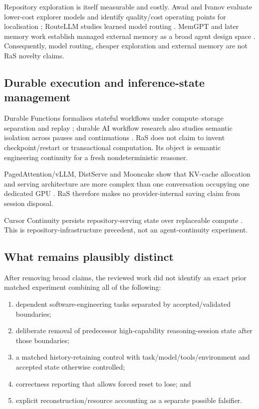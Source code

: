 Repository exploration is itself measurable and costly. Awad and Ivanov evaluate lower-cost explorer models and identify quality/cost operating points for localisation \citep{awad2026exploration}; RouteLLM studies learned model routing \citep{ong2024routellm}. MemGPT and later memory work establish managed external memory as a broad agent design space \citep{packer2023memgpt,du2026memory,luo2026memory}. Consequently, model routing, cheaper exploration and external memory are not RaS novelty claims.

\subsection{Durable execution and inference-state management}

Durable Functions formalises stateful workflows under compute--storage separation and replay \citep{burckhardt2021durable}; durable AI workflow research also studies semantic isolation across pauses and continuations \citep{mozafari2026semantic}. RaS does not claim to invent checkpoint/restart or transactional computation. Its object is semantic engineering continuity for a fresh nondeterministic reasoner.

PagedAttention/vLLM, DistServe and Mooncake show that KV-cache allocation and serving architecture are more complex than one conversation occupying one dedicated GPU \citep{kwon2023vllm,zhong2024distserve,qin2024mooncake}. RaS therefore makes no provider-internal saving claim from session disposal.

Cursor Continuity persists repository-serving state over replaceable compute \citep{marti2026continuity}. This is repository-infrastructure precedent, not an agent-continuity experiment.

\subsection{What remains plausibly distinct}

After removing broad claims, the reviewed work did not identify an exact prior matched experiment combining all of the following:

\begin{enumerate}
    \item dependent software-engineering tasks separated by accepted/validated boundaries;
    \item deliberate removal of predecessor high-capability reasoning-session state after those boundaries;
    \item a matched history-retaining control with task/model/tools/environment and accepted state otherwise controlled;
    \item correctness reporting that allows forced reset to lose; and
    \item explicit reconstruction/resource accounting as a separate possible falsifier.
\end{enumerate}

